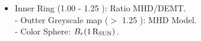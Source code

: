 \documentclass{beamer}
\begin{document}
{\begin{center}
\begin{columns}
\begin{center}
\end{center}
\end{columns}
\end{center}
\begin{itemize}
\item
Inner Ring (1.00 - 1.25 \rsun): Ratio MHD/DEMT.\\
- Outter Greyscale map ($>$ 1.25 \rsun): MHD Model.\\
- Color Sphere: $B_r(1\,{\rm R_{\rm SUN}})$.
\end{itemize}
}
\end{document}
